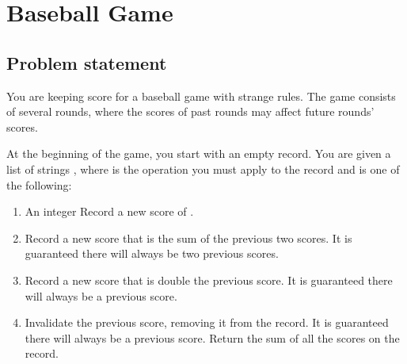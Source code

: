 \documentclass[letterpaper,12pt,english]{book}
\begin{document}
\sphinxstepscope


\section{Baseball Game}
\label{\detokenize{String/08_STR_682_Baseball_Game:baseball-game}}\label{\detokenize{String/08_STR_682_Baseball_Game::doc}}

\subsection{Problem statement\sphinxfootnotemark[31]}
\label{\detokenize{String/08_STR_682_Baseball_Game:problem-statement}}%
\begin{footnotetext}[31]\sphinxAtStartFootnote
{}
%
\end{footnotetext}\ignorespaces 
\sphinxAtStartPar
You are keeping score for a baseball game with strange rules. The game consists of several rounds, where the scores of past rounds may affect future rounds’ scores.

\sphinxAtStartPar
At the beginning of the game, you start with an empty record. You are given a list of strings , where  is the  operation you must apply to the record and is one of the following:
\begin{enumerate}
%
\item {} 
\sphinxAtStartPar
An integer  \sphinxhyphen{} Record a new score of .

\item {} 
\sphinxAtStartPar
{} \sphinxhyphen{} Record a new score that is the sum of the previous two scores. It is guaranteed there will always be two previous scores.

\item {} 
\sphinxAtStartPar
{} \sphinxhyphen{} Record a new score that is double the previous score. It is guaranteed there will always be a previous score.

\item {} 
\sphinxAtStartPar
{} \sphinxhyphen{} Invalidate the previous score, removing it from the record. It is guaranteed there will always be a previous score.
Return the sum of all the scores on the record.

\end{enumerate}
\end{document}
